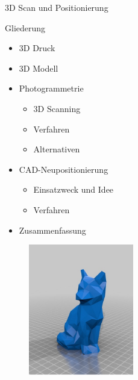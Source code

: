 \documentclass[t, aspectratio=169]{beamer}
\begin{document}
\begin{frame}{3D Scan und Positionierung}
    \begin{minipage}[b]{.49\textwidth}
    \begin{block}{Gliederung}
        \begin{itemize}
            \item 3D Druck
            \item 3D Modell
            \item Photogrammetrie
            \begin{itemize}
                \item 3D Scanning
                \item Verfahren
                \item Alternativen
            \end{itemize}
            \item CAD-Neupositionierung
            \begin{itemize}
                \item Einsatzweck und Idee
                \item Verfahren
            \end{itemize}
            \item Zusammenfassung
        \end{itemize}
        \end{block}
        \end{minipage}
        \begin{minipage}[b]{.49\textwidth}
        \begin{figure}
            \centering
            \includegraphics[width=130pt]{img_niklas/fox.PNG}
            \label{fig:my_label}
        \end{figure}
        \end{minipage}

\end{frame}








\end{document}
